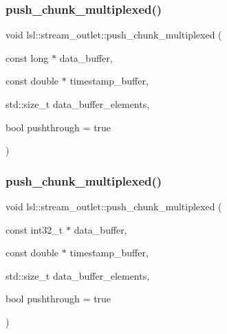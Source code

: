 \mbox{\label{classlsl_1_1stream__outlet_a3ec413951e8613ce5289a265aaabf6e9}} 
\subsubsection{\texorpdfstring{push\+\_\+chunk\+\_\+multiplexed()}{push\_chunk\_multiplexed()}\hspace{0.1cm}{\footnotesize\ttfamily [24/28]}}
{\footnotesize\ttfamily void lsl\+::stream\+\_\+outlet\+::push\+\_\+chunk\+\_\+multiplexed (\begin{DoxyParamCaption}\item[{const long $\ast$}]{data\+\_\+buffer,  }\item[{const double $\ast$}]{timestamp\+\_\+buffer,  }\item[{std\+::size\+\_\+t}]{data\+\_\+buffer\+\_\+elements,  }\item[{bool}]{pushthrough = {\ttfamily true} }\end{DoxyParamCaption})\hspace{0.3cm}{\ttfamily [inline]}}

\mbox{\label{classlsl_1_1stream__outlet_a10acfcf6b1db179f04596def60bc3792}} 
\subsubsection{\texorpdfstring{push\+\_\+chunk\+\_\+multiplexed()}{push\_chunk\_multiplexed()}\hspace{0.1cm}{\footnotesize\ttfamily [25/28]}}
{\footnotesize\ttfamily void lsl\+::stream\+\_\+outlet\+::push\+\_\+chunk\+\_\+multiplexed (\begin{DoxyParamCaption}\item[{const int32\+\_\+t $\ast$}]{data\+\_\+buffer,  }\item[{const double $\ast$}]{timestamp\+\_\+buffer,  }\item[{std\+::size\+\_\+t}]{data\+\_\+buffer\+\_\+elements,  }\item[{bool}]{pushthrough = {\ttfamily true} }\end{DoxyParamCaption})\hspace{0.3cm}{\ttfamily [inline]}}


